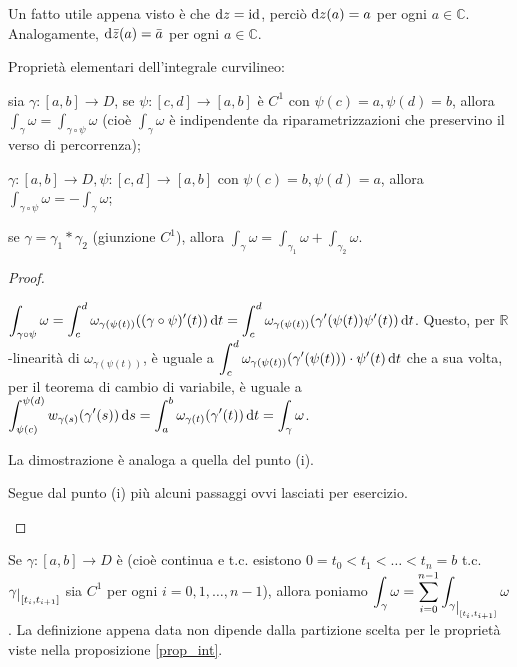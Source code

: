 \begin{ftt}
  Un fatto utile appena visto è che $\mathop{}\!\mathrm{d} z=\operatorname{id}$, perciò $\mathop{}\!\mathrm{d} z(a)=a$ per ogni $a \in \mathbb{C}$. Analogamente, $\mathop{}\!\mathrm{d} \bar{z}(a)=\bar{a}$ per ogni $a \in \mathbb{C}$.
\end{ftt}

\begin{prop} \label{prop_int}
  Proprietà elementari dell'integrale curvilineo:
  \begin{nlist}
    \item sia $\gamma:[a, b] \longrightarrow D$, se $\psi:[c, d] \longrightarrow [a, b]$ è $C^1$ con $\psi(c)=a, \psi(d)=b$, allora $\displaystyle \int_{\gamma} \omega=\int_{\gamma \circ \psi} \omega$ (cioè $\displaystyle \int_{\gamma} \omega$ è indipendente da riparametrizzazioni che preservino il verso di percorrenza);
    \item $\gamma:[a, b] \longrightarrow D, \psi:[c, d] \longrightarrow [a, b]$ con $\psi(c)=b, \psi(d)=a$, allora $\displaystyle \int_{\gamma \circ \psi} \omega=-\int_{\gamma} \omega$;
    \item se $\gamma=\gamma_1*\gamma_2$ (giunzione $C^1$), allora $\displaystyle \int_{\gamma} \omega=\int_{\gamma_1} \omega+\int_{\gamma_2} \omega$.
  \end{nlist}
\end{prop}

\begin{proof}
  \begin{nlist}
    \item $\displaystyle \int_{\gamma \circ \psi} \omega=\int_c^d \omega_{\gamma(\psi(t))}((\gamma \circ \psi)'(t))\mathop{}\!\mathrm{d} t=\int_c^d \omega_{\gamma(\psi(t))} (\gamma'(\psi(t))\psi'(t))\mathop{}\!\mathrm{d} t$.
    Questo, per $\mathbb{R}$-linearità di $\omega_{\gamma(\psi(t))}$, è uguale a $\displaystyle \int_c^d \omega_{\gamma(\psi(t))}(\gamma'(\psi(t)))\cdot\psi'(t)\mathop{}\!\mathrm{d} t$ che a sua volta, per il teorema di cambio di variabile, è uguale a $\displaystyle \int_{\psi(c)}^{\psi(d)} w_{\gamma(s)}(\gamma'(s))\mathop{}\!\mathrm{d} s=\int_a^b \omega_{\gamma(t)}(\gamma'(t))\mathop{}\!\mathrm{d} t=\int_{\gamma} \omega$.
    \item La dimostrazione è analoga a quella del punto (i).
    \item Segue dal punto (i) più alcuni passaggi ovvi lasciati per esercizio.
  \end{nlist}
\end{proof}

\begin{defn}
  Se $\gamma:[a, b] \longrightarrow D$ è  (cioè continua e t.c. esistono $0=t_0<t_1<\dots<t_n=b$ t.c. $\gamma\restrict{[t_i, t_{i+1}]}$ sia $C^1$ per ogni $i=0, 1, \dots, n-1$), allora poniamo $\displaystyle \int_{\gamma} \omega=\sum_{i=0}^{n-1} \int_{\gamma\restrict{[t_i, t_{i+1}]}} \omega$.
  La definizione appena data non dipende dalla partizione scelta per le proprietà viste nella proposizione \ref{prop_int}.
\end{defn}

